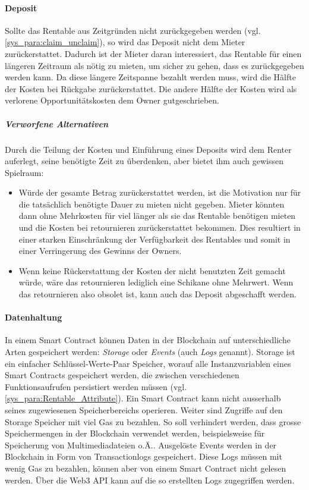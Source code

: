 \paragraph{Deposit}
Sollte das Rentable aus Zeitgründen nicht zurückgegeben werden (vgl. \ref{sys_para:claim_unclaim}), so wird das Deposit nicht dem Mieter zurückerstattet. Dadurch ist der Mieter daran interessiert, das Rentable für einen längeren Zeitraum als nötig zu mieten, um sicher zu gehen, dass es zurückgegeben werden kann. Da diese längere Zeitspanne bezahlt werden muss, wird die Hälfte der Kosten bei Rückgabe zurückerstattet. Die andere Hälfte der Kosten wird als verlorene Opportunitätskosten dem Owner gutgeschrieben.
\subparagraph{Verworfene Alternativen}
Durch die Teilung der Kosten und Einführung eines Deposits wird dem Renter auferlegt, seine benötigte Zeit zu überdenken, aber bietet ihm auch gewissen Spielraum:
\begin{itemize}
    \item Würde der gesamte Betrag zurückerstattet werden, ist die Motivation nur für die tatsächlich benötigte Dauer zu mieten nicht gegeben. Mieter könnten dann ohne Mehrkosten für viel länger als sie das Rentable benötigen mieten und die Kosten bei retournieren zurückerstattet bekommen. Dies resultiert in einer starken Einschränkung der Verfügbarkeit des Rentables und somit in einer Verringerung des Gewinns der Owners.
    \item Wenn keine Rückerstattung der Kosten der nicht benutzten Zeit gemacht würde, wäre das retournieren lediglich eine Schikane ohne Mehrwert. Wenn das retournieren also obsolet ist, kann auch das Deposit abgeschafft werden.
\end{itemize}


\paragraph{Datenhaltung}
In einem Smart Contract können Daten in der Blockchain auf unterschiedliche Arten gespeichert werden: \emph{Storage} oder \emph{Events} (auch \emph{Logs} genannt). Storage ist ein einfacher Schlüssel-Werte-Paar Speicher, worauf alle Instanzvariablen eines Smart Contracts gespeichert werden, die zwischen verschiedenen Funktionsaufrufen persistiert werden müssen (vgl. \ref{sys_para:Rentable_Attribute}). Ein Smart Contract kann nicht ausserhalb seines zugewiesenen Speicherbereichs operieren. Weiter sind Zugriffe auf den Storage Speicher mit viel Gas zu bezahlen. So soll verhindert werden, dass grosse Speichermengen in der Blockchain verwendet werden, beispielsweise für Speicherung von Multimediadateien o.Ä.. Ausgelöste Events werden in der Blockchain in Form von Transactionlogs gespeichert. Diese Logs müssen mit wenig Gas zu bezahlen, können aber von einem Smart Contract nicht gelesen werden. Über die Web3 API kann auf die so erstellten Logs zugegriffen werden.\cite[Miscellaneous/Introduction to Smart Contracts]{solidity.readthedocs.io}\cite{jonathanpatrick.me/ethereum}

